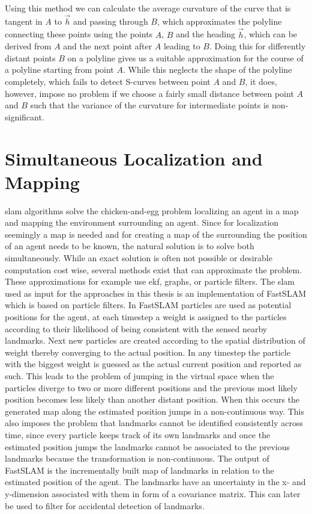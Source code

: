 
Using this method we can calculate the average curvature of the curve that is tangent in $A$ to $\vec h$ and passing through $B$, which approximates the polyline connecting these points using the points $A$, $B$ and the heading  $\vec h$, which can be derived from $A$ and the next point after $A$ leading to $B$.
Doing this for differently distant points $B$ on a polyline gives us a suitable approximation for the course of a polyline starting from point $A$. While this neglects the shape of the polyline completely, which fails to detect S-curves between point $A$ and $B$, it does, however, impose no problem if we choose a fairly small distance between point $A$ and $B$ such that the variance of the curvature for intermediate points is non-significant.


\section{Simultaneous Localization and Mapping}
\ac{slam} algorithms solve the chicken-and-egg problem localizing an agent in a map and mapping the environment surrounding an agent. Since for localization seemingly a map is needed and for creating a map of the surrounding the position of an agent needs to be known, the natural solution is to solve both simultaneously. While an exact solution is often not possible  or desirable computation cost wise, several methods exist that can approximate the problem. These approximations for example use \ac{ekf}, graphs, or particle filters. The \ac{slam} used as input for the approaches in this thesis is an implementation of FastSLAM \cite{FastSLAM2002} which is based on particle filters. In FastSLAM particles are used as potential positions for the agent, at each timestep a weight is assigned to the particles according to their likelihood of being consistent with the sensed nearby landmarks. Next new particles are created according to the spatial distribution of weight thereby converging to the actual position. In any timestep the particle with the biggest weight is guessed as the actual current position and reported as such. This leads to the problem of jumping in the virtual space when the particles diverge to two or more different positions and the previous most likely position becomes less likely than another distant position. When this occurs the generated map along the estimated position jumps in a non-continuous way. This also imposes the problem that landmarks cannot be identified consistently across time, since every particle keeps track of its own landmarks and once the estimated position jumps the landmarks cannot be associated to the previous landmarks because the transformation is non-continuous. The output of FastSLAM is the incrementally built map of landmarks in relation to the estimated position of the agent. The landmarks have an uncertainty in the x- and y-dimension associated with them in form of a covariance matrix. This can later be used to filter for accidental detection of landmarks.

